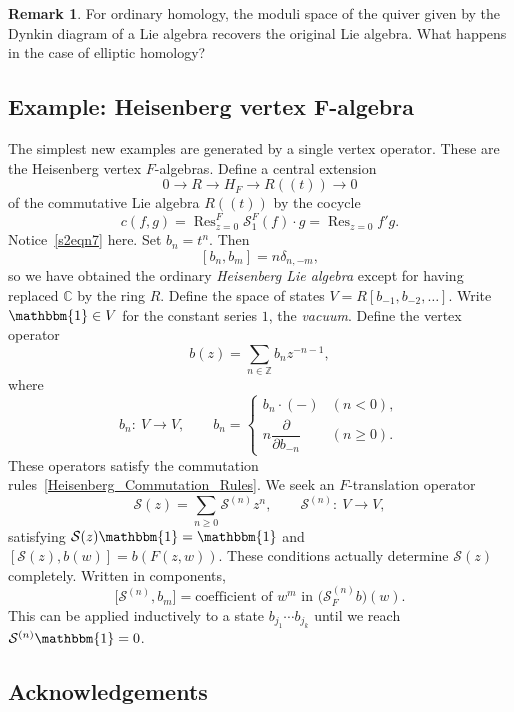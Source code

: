 \documentclass[10pt,a4paper]{amsart}
\numberwithin{equation}{section}
\theoremstyle{definition}
\newtheorem{Remark}[Theorem]{Remark}
\DeclareMathOperator\Res{Res}
\begin{document}
\begin{Remark}
For ordinary homology, the moduli space of the quiver given by the Dynkin diagram of a Lie algebra recovers the original Lie algebra. What happens in the case of elliptic homology?
\end{Remark}

\subsection[Example: Heisenberg vertex F-algebra]{Example: Heisenberg vertex $\boldsymbol{F}$-algebra}
\label{s44}

The simplest new examples are generated by a single vertex operator. These are the Heisenberg vertex $F$-algebras. Define a central extension
\[
 0\longrightarrow R\longrightarrow H_F\longrightarrow R(\!( t)\!)\longrightarrow0
\]
of the commutative Lie algebra $R(\!( t)\!)$ by the cocycle
\[
 c(f,g)=\Res^F_{z=0} \mathcal{S}_1^F(f)\cdot g=\Res_{z=0} f'g.
\]
Notice~\eqref{s2eqn7} here. Set $b_n=t^n$. Then
\begin{equation}
\label{Heisenberg_Commutation_Rules}
 [b_n,b_m]=n\delta_{n,-m},
\end{equation}
so we have obtained the ordinary \emph{Heisenberg Lie algebra} except for having replaced $\mathbb{C}$ by the ring $R$. Define the space of states
$
 V=R[b_{-1},b_{-2},\dots]$.
Write $\mathbbm{1}\in V$ for the constant series $1$, the \emph{vacuum}. Define the vertex operator
\[
 b(z)=\sum_{n\in\mathbb{Z}} b_nz^{-n-1},
\]
where
\[
 b_n\colon\ V\longrightarrow V,\qquad
 b_n
 =
 \begin{cases}
 b_n\cdot(-) &(n<0),\\
 n\dfrac{\partial}{\partial b_{-n}} & (n\geqslant0).
 \end{cases}
\]
These operators satisfy the commutation rules~\eqref{Heisenberg_Commutation_Rules}. We seek an $F$-translation operator
\[
 \mathcal{S}(z)=\sum_{n\geqslant0} \mathcal{S}^{(n)}z^n,\qquad \mathcal{S}^{(n)}\colon\ V\longrightarrow V,
\]
satisfying $\mathcal{S}(z)\mathbbm{1}=\mathbbm{1}$ and
$
 [\mathcal{S}(z), b(w)]=b(F(z,w))$.
These conditions actually determine $\mathcal{S}(z)$ completely. Written in components,
\[
 \big[\mathcal{S}^{(n)},b_m\big] = \text{coefficient of $w^m$ in }\bigl(\mathcal{S}^{(n)}_Fb\bigr)(w).
\]
This can be applied inductively to a state $b_{j_1}\cdots b_{j_k}$ until we reach $\mathcal{S}^{(n)}\mathbbm{1}=0$.

\subsection*{Acknowledgements}
\end{document}
